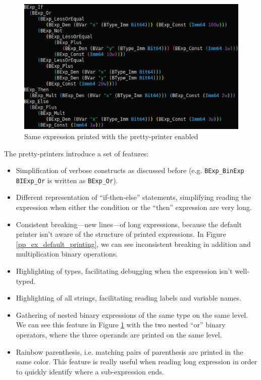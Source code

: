 \documentclass{kththesis}
\begin{document}
\begin{figure}[!h]
	\includegraphics[width=\textwidth]{figures/pp_ex_pretty_printing.png}
	\centering
	\caption{Same expression printed with the pretty-printer enabled}
	\label{pp_ex_pretty_printing}
\end{figure}

The pretty-printers introduce a set of features:

\begin{itemize}
    \item Simplification of verbose constructs as discussed before (e.g. \texttt{BExp\_BinExp BIExp\_Or} is written as \texttt{BExp\_Or}).
    \item Different representation of ``if-then-else'' statements, simplifying reading the expression when either the condition or the ``then'' expression are very long.
    \item Consistent breaking---new lines---of long expressions, because the default printer isn't aware of the structure of printed expressions. In Figure \ref{pp_ex_default_printing}, we can see inconsistent breaking in addition and multiplication binary operations.
    \item Highlighting of types, facilitating debugging when the expression isn't well-typed.
    \item Highlighting of all strings, facilitating reading labels and variable names.
    \item Gathering of nested binary expressions of the same type on the same level. We can see this feature in Figure \ref{pp_ex_pretty_printing} with the two nested ``or'' binary operators, where the three operands are printed on the same level.
    \item Rainbow parenthesis, i.e. matching pairs of parenthesis are printed in the same color. This feature is really useful when reading long expression in order to quickly identify where a sub-expression ends.
\end{itemize}
\end{document}
